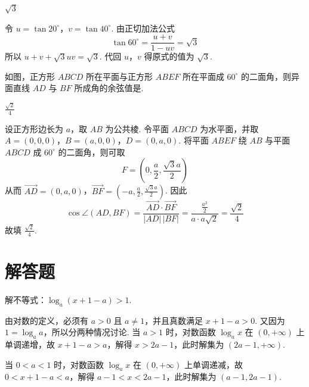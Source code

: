 \documentclass[UTF8,a4paper,oneside,11pt]{ctexbook}
\begin{document}
\begin{answer}
\(\sqrt{3}\)
\end{answer}

\begin{solution}
令 \(u=\tan20^{\circ}\)，\(v=\tan40^{\circ}\). 由正切加法公式
\[
\tan60^{\circ}=\frac{u+v}{1-uv}=\sqrt{3}
\]
所以 \(u+v+\sqrt{3}uv=\sqrt{3}\). 代回 \(u\)，\(v\) 得原式的值为 \(\sqrt{3}\).
\end{solution}

\begin{problem}
如图，正方形 \(ABCD\) 所在平面与正方形 \(ABEF\) 所在平面成 \(60^{\circ}\) 的二面角，则异面直线 \(AD\) 与 \(BF\) 所成角的余弦值是\fillinblank{}.

\end{problem}

\begin{answer}
\(\frac{\sqrt{2}}{4}\)
\end{answer}

\begin{solution}
设正方形边长为 \(a\)，取 \(AB\) 为公共棱. 令平面 \(ABCD\) 为水平面，并取
\(A=(0,0,0)\)，\(B=(a,0,0)\)，\(D=(0,a,0)\).
将平面 \(ABEF\) 绕 \(AB\) 与平面 \(ABCD\) 成 \(60^{\circ}\) 的二面角，则可取
\[
F=\left(0,\frac{a}{2},\frac{\sqrt{3}a}{2}\right)
\]
从而 \(\overrightarrow{AD}=(0,a,0)\)，\(\overrightarrow{BF}=\left(-a,\frac{a}{2},\frac{\sqrt{3}a}{2}\right)\). 因此
\[
\cos\angle(AD,BF)=\frac{\overrightarrow{AD}\cdot\overrightarrow{BF}}{|AD|\,|BF|}
=\frac{\frac{a^2}{2}}{a\cdot a\sqrt{2}}=\frac{\sqrt{2}}{4}
\]
故填 \(\frac{\sqrt{2}}{4}\).
\end{solution}

\section{解答题}

\begin{problem}
解不等式：\(\log_a(x + 1 - a) > 1\).
\end{problem}

\begin{solution}
由对数的定义，必须有 \(a>0\) 且 \(a\ne1\)，并且真数满足 \(x+1-a>0\). 又因为 \(1=\log_a a\)，所以分两种情况讨论. 当 \(a>1\) 时，对数函数 \(\log_a x\) 在 \((0,+\infty)\) 上单调递增，故 \(x+1-a>a\)，解得 \(x>2a-1\)，此时解集为 \(\left(2a-1,+\infty\right)\).

当 \(0<a<1\) 时，对数函数 \(\log_a x\) 在 \((0,+\infty)\) 上单调递减，故 \(0<x+1-a<a\)，解得 \(a-1<x<2a-1\)，此时解集为 \(\left(a-1,2a-1\right)\).
\end{solution}
\end{document}
